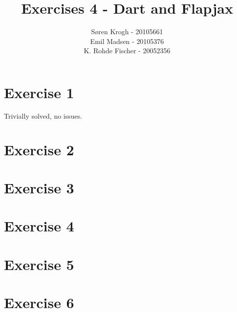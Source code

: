 \documentclass[a4paper,10pt]{article}
\author{
Søren Krogh -  20105661 \\
Emil Madsen - 20105376  \\
K. Rohde Fischer - 20052356\\}
\title{Exercises 4 - Dart and Flapjax}
\begin{document}
\maketitle

\section*{Exercise 1}
Trivially solved, no issues.

\section*{Exercise 2}

\section*{Exercise 3}

\section*{Exercise 4}


\section*{Exercise 5}


\section*{Exercise 6}
\end{document}
